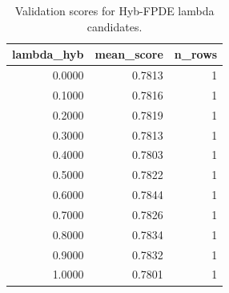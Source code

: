 \begin{table}[t]
\caption{Validation scores for Hyb-FPDE lambda candidates.}
\label{tab:lambda_distribution_computed}
\centering
\begin{tabular}{rrr}
\toprule
lambda\_hyb & mean\_score & n\_rows \\
\midrule
0.0000 & 0.7813 & 1 \\
0.1000 & 0.7816 & 1 \\
0.2000 & 0.7819 & 1 \\
0.3000 & 0.7813 & 1 \\
0.4000 & 0.7803 & 1 \\
0.5000 & 0.7822 & 1 \\
0.6000 & 0.7844 & 1 \\
0.7000 & 0.7826 & 1 \\
0.8000 & 0.7834 & 1 \\
0.9000 & 0.7832 & 1 \\
1.0000 & 0.7801 & 1 \\
\bottomrule
\end{tabular}

\end{table}

